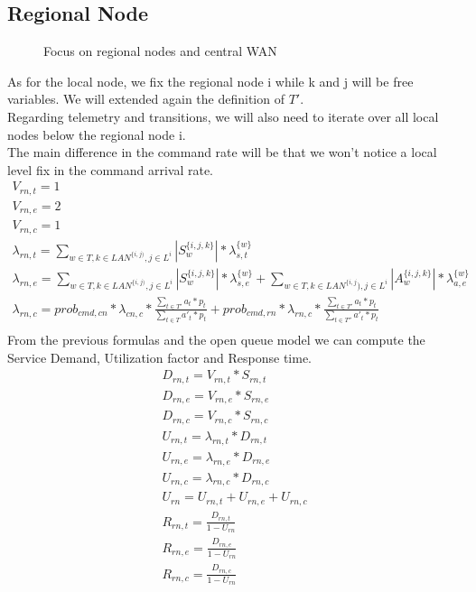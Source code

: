 \documentclass[11pt]{article}
\begin{document}
\subsection{Regional Node}
\begin{figure}[H]
	\centering
	\hspace*{-3.7cm}
	\frame{}
	\caption{Focus on regional nodes and central WAN}
\end{figure}
As for the local node, we fix the regional node i while k and j will be free variables. We will extended again the definition of $T'$.\\
Regarding telemetry and transitions, we will also need to iterate over all local nodes below the regional node i.\\
The main difference in the command rate will be that we won't notice a local level fix in the command arrival rate.
\begin{equation}
	\begin{array}{l}
		V_{rn, t} = 1 \\
		V_{rn, e} = 2 \\ %
		V_{rn,c} = 1 \\
        \lambda_{rn, t} = \sum\limits_{w \in T,k \in LAN^{\{i,j)},j \in L^i}{| S^{\{i,j,k\}}_{w} | * \lambda^{\{w\}}_{s, t}}  \\
        \lambda_{rn, e} = \sum\limits_{w \in T,k \in LAN^{\{i,j)},j \in L^i}{| S^{\{i,j,k\}}_{w} | * \lambda^{\{w\}}_{s, e}} + \sum\limits_{w \in T,k \in LAN^{\{i,j}),j \in L^i}{| A^{\{i,j,k\}}_{w} | * \lambda^{\{w\}}_{a, e}}\\
		\lambda_{rn, c} = prob_{cmd,cn} * \lambda_{cn, c} * \frac{\sum\limits_{t \in T'}{a_{t} * p_{t}}}{\sum\limits_{t \in T}{a'_{t} * p_{t}}} + prob_{cmd,rn} * \lambda_{rn, c} *\frac{\sum\limits_{t \in T'}{a_{t} * p_{t}}}{\sum\limits_{t \in T''}{a'_{t} * p_{t}}} \\\

	\end{array}
\end{equation}
From the previous formulas and the open queue model we can compute the Service Demand, Utilization factor and Response time.
\begin{equation}
	\begin{array}{l}
		D_{rn, t} = V_{rn, t} * S_{rn, t} \\
		D_{rn, e} = V_{rn, e} * S_{rn, e} \\
		D_{rn, c} = V_{rn, c} * S_{rn, c} \\
		U_{rn, t} = \lambda_{rn, t} * D_{rn, t} \\
		U_{rn, e} = \lambda_{rn, e} * D_{rn, e} \\
		U_{rn, c} = \lambda_{rn, c} * D_{rn, c} \\
		U_{rn} = U_{rn, t} + U_{rn, e} + U_{rn, c} \\
		R_{rn, t} = \frac{D_{rn, t}}{1 - U_{rn}} \\
		R_{rn, e} = \frac{D_{rn, e}}{1 - U_{rn}} \\
		R_{rn, c} = \frac{D_{rn, c}}{1 - U_{rn}} \\
	\end{array}
\end{equation}
\end{document}
